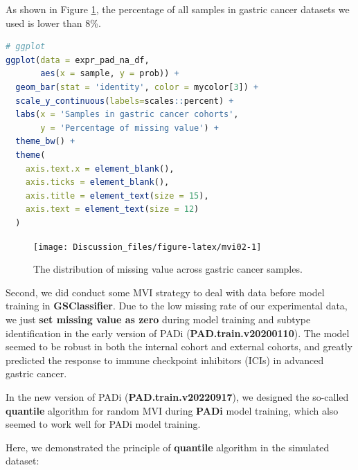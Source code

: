 \documentclass[
  12pt,
]{book}
\begin{document}
As shown in Figure \ref{fig:mvi02}, the percentage of all samples in gastric cancer datasets we used is lower than 8\%.

\begin{lstlisting}[language=R]
# ggplot
ggplot(data = expr_pad_na_df, 
       aes(x = sample, y = prob)) + 
  geom_bar(stat = 'identity', color = mycolor[3]) + 
  scale_y_continuous(labels=scales::percent) + 
  labs(x = 'Samples in gastric cancer cohorts', 
       y = 'Percentage of missing value') + 
  theme_bw() +
  theme(
    axis.text.x = element_blank(),
    axis.ticks = element_blank(),
    axis.title = element_text(size = 15),
    axis.text = element_text(size = 12)
  )
\end{lstlisting}

\begin{figure}

{\centering \texttt{[image: Discussion\_files/figure-latex/mvi02-1]} 

}

\caption{The distribution of missing value across gastric cancer samples.}\label{fig:mvi02}
\end{figure}

Second, we did conduct some MVI strategy to deal with data before model training in \textbf{GSClassifier}. Due to the low missing rate of our experimental data, we just \textbf{set missing value as zero} during model training and subtype identification in the early version of PADi (\textbf{PAD.train.v20200110}). The model seemed to be robust in both the internal cohort and external cohorts, and greatly predicted the response to immune checkpoint inhibitors (ICIs) in advanced gastric cancer.

In the new version of PADi (\textbf{PAD.train.v20220917}), we designed the so-called \textbf{quantile} algorithm for random MVI during \textbf{PADi} model training, which also seemed to work well for PADi model training.

Here, we demonstrated the principle of \textbf{quantile} algorithm in the simulated dataset:
\end{document}
